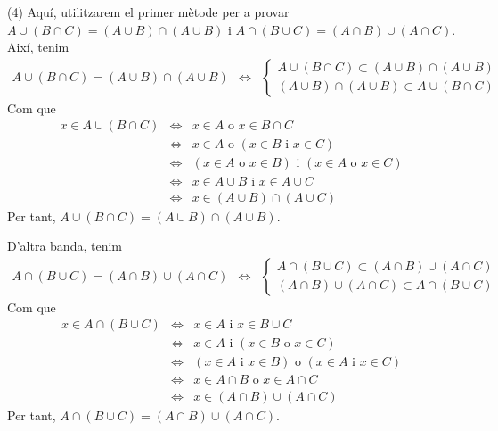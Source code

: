 \begin{solucio}
(4) Aquí, utilitzarem el primer mètode per a provar $A\cup (B\cap
C)=(A\cup B)\cap (A\cup B)$ i $A\cap (B\cup C)=(A\cap B)\cup (A\cap C)$. Així, tenim%
\begin{equation*}
\begin{array}{ccc}
A\cup (B\cap C)=(A\cup B)\cap (A\cup B) & \Longleftrightarrow & \left\{
\begin{array}{c}
A\cup (B\cap C)\subset (A\cup B)\cap (A\cup B) \\
(A\cup B)\cap (A\cup B)\subset A\cup (B\cap C)%
\end{array}%
\right.%
\end{array}%
\end{equation*}%
Com que%
\begin{equation*}
\begin{array}{lll}
x\in A\cup (B\cap C) & \Longleftrightarrow & x\in A\text{ o }x\in B\cap C \\
& \Longleftrightarrow & x\in A\text{ o }\left( x\in B\text{ i }x\in C\right)
\\
& \Longleftrightarrow & \left( x\in A\text{ o }x\in B\right) \text{ i }%
\left( x\in A\text{ o }x\in C\right) \\
& \Longleftrightarrow & x\in A\cup B\text{ i }x\in A\cup C \\
& \Longleftrightarrow & x\in (A\cup B)\cap (A\cup C)%
\end{array}%
\end{equation*}%
Per tant, $A\cup (B\cap C)=(A\cup B)\cap (A\cup B)$.

D'altra banda, tenim%
\begin{equation*}
\begin{array}{ccc}
A\cap (B\cup C)=(A\cap B)\cup (A\cap C) & \Longleftrightarrow & \left\{
\begin{array}{c}
A\cap (B\cup C)\subset (A\cap B)\cup (A\cap C) \\
(A\cap B)\cup (A\cap C)\subset A\cap (B\cup C)%
\end{array}%
\right.%
\end{array}%
\end{equation*}%
Com que%
\begin{equation*}
\begin{array}{lll}
x\in A\cap (B\cup C) & \Longleftrightarrow & x\in A\text{ i }x\in B\cup C \\
& \Longleftrightarrow & x\in A\text{ i }\left( x\in B\text{ o }x\in C\right)
\\
& \Longleftrightarrow & \left( x\in A\text{ i }x\in B\right) \text{ o }%
\left( x\in A\text{ i }x\in C\right) \\
& \Longleftrightarrow & x\in A\cap B\text{ o }x\in A\cap C \\
& \Longleftrightarrow & x\in (A\cap B)\cup (A\cap C)%
\end{array}%
\end{equation*}%
Per tant, $A\cap (B\cup C)=(A\cap B)\cup (A\cap C)$.


\end{solucio}
